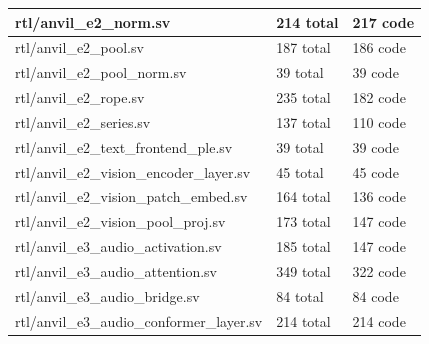 \documentclass[11pt,a4paper]{article}
\begin{document}
{\begin{longtable}{@{}L{0.55\textwidth}|L{0.18\textwidth}|L{0.18\textwidth}@{}}
rtl/\allowbreak{}anvil\_\allowbreak{}e2\_\allowbreak{}norm.sv & 214 total & 217 code\\[2pt]\hline

rtl/\allowbreak{}anvil\_\allowbreak{}e2\_\allowbreak{}pool.sv & 187 total & 186 code\\[2pt]\hline

rtl/\allowbreak{}anvil\_\allowbreak{}e2\_\allowbreak{}pool\_\allowbreak{}norm.sv & 39 total & 39 code\\[2pt]\hline

rtl/\allowbreak{}anvil\_\allowbreak{}e2\_\allowbreak{}rope.sv & 235 total & 182 code\\[2pt]\hline

rtl/\allowbreak{}anvil\_\allowbreak{}e2\_\allowbreak{}series.sv & 137 total & 110 code\\[2pt]\hline

rtl/\allowbreak{}anvil\_\allowbreak{}e2\_\allowbreak{}text\_\allowbreak{}frontend\_\allowbreak{}ple.sv & 39 total & 39 code\\[2pt]\hline

rtl/\allowbreak{}anvil\_\allowbreak{}e2\_\allowbreak{}vision\_\allowbreak{}encoder\_\allowbreak{}layer.sv & 45 total & 45 code\\[2pt]\hline

rtl/\allowbreak{}anvil\_\allowbreak{}e2\_\allowbreak{}vision\_\allowbreak{}patch\_\allowbreak{}embed.sv & 164 total & 136 code\\[2pt]\hline

rtl/\allowbreak{}anvil\_\allowbreak{}e2\_\allowbreak{}vision\_\allowbreak{}pool\_\allowbreak{}proj.sv & 173 total & 147 code\\[2pt]\hline

rtl/\allowbreak{}anvil\_\allowbreak{}e3\_\allowbreak{}audio\_\allowbreak{}activation.sv & 185 total & 147 code\\[2pt]\hline

rtl/\allowbreak{}anvil\_\allowbreak{}e3\_\allowbreak{}audio\_\allowbreak{}attention.sv & 349 total & 322 code\\[2pt]\hline

rtl/\allowbreak{}anvil\_\allowbreak{}e3\_\allowbreak{}audio\_\allowbreak{}bridge.sv & 84 total & 84 code\\[2pt]\hline

rtl/\allowbreak{}anvil\_\allowbreak{}e3\_\allowbreak{}audio\_\allowbreak{}conformer\_\allowbreak{}layer.sv & 214 total & 214 code\\[2pt]\hline


\end{longtable}}
\end{document}

